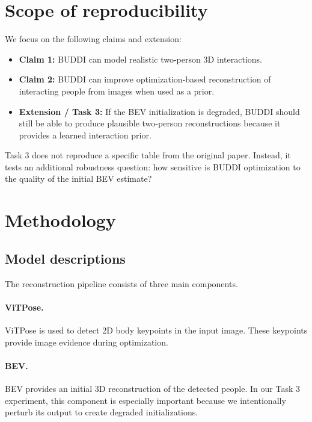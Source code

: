 \documentclass[10pt]{article}
\begin{document}
\section{Scope of reproducibility}
\label{sec:claims}

We focus on the following claims and extension:

\begin{itemize}
    \item \textbf{Claim 1:} BUDDI can model realistic two-person 3D interactions.
    \item \textbf{Claim 2:} BUDDI can improve optimization-based reconstruction of interacting people from images when used as a prior.
    \item \textbf{Extension / Task 3:} If the BEV initialization is degraded, BUDDI should still be able to produce plausible two-person reconstructions because it provides a learned interaction prior.
\end{itemize}

Task 3 does not reproduce a specific table from the original paper. Instead, it tests an additional robustness question: how sensitive is BUDDI optimization to the quality of the initial BEV estimate?

\section{Methodology}

\subsection{Model descriptions}

The reconstruction pipeline consists of three main components.

\paragraph{ViTPose.}
ViTPose is used to detect 2D body keypoints in the input image. These keypoints provide image evidence during optimization.

\paragraph{BEV.}
BEV provides an initial 3D reconstruction of the detected people. In our Task 3 experiment, this component is especially important because we intentionally perturb its output to create degraded initializations.
\end{document}

